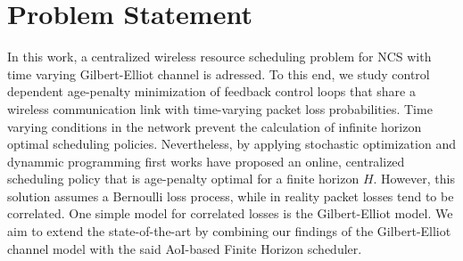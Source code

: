 
\section*{Problem Statement}
In this work, a centralized wireless resource scheduling problem for NCS with
time varying Gilbert-Elliot channel is adressed. To this end, we study control
dependent age-penalty minimization of feedback control loops that share a
wireless communication link with time-varying packet loss probabilities. Time
varying conditions in the network prevent the calculation of infinite horizon
optimal scheduling policies. Nevertheless, by applying stochastic optimization
and dynammic programming first works have proposed an online, centralized
scheduling policy that is age-penalty optimal for a finite horizon $H$. However,
this solution assumes a Bernoulli loss process, while in reality packet losses
tend to be correlated. One simple model for correlated losses is the
Gilbert-Elliot model. We aim to extend the state-of-the-art by combining our
findings of the Gilbert-Elliot channel model with the said AoI-based Finite
Horizon scheduler.

